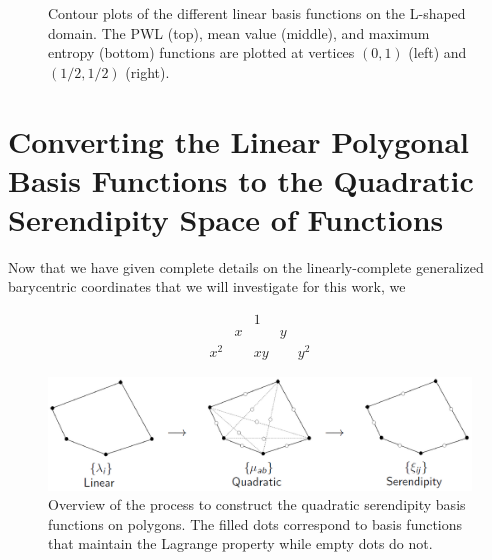 \begin{figure}
{\begin{subfigure}[b]{0.375\textwidth}
	\end{subfigure}
}
\vspace{2mm}
\caption[Contour plots of the linear basis functions on the L-shaped domain.]{Contour plots of the different linear basis functions on the L-shaped domain. The PWL (top), mean value (middle), and maximum entropy (bottom) functions are plotted at vertices $(0,1)$ (left) and $(1/2,1/2)$ (right).}
\label{fig::2DSummary_Ldom_basis_functions}
\end{figure}

\section{Converting the Linear Polygonal Basis Functions to the Quadratic Serendipity Space of Functions}
\label{sec::BF_2DQuadratic}

Now that we have given complete details on the linearly-complete generalized barycentric coordinates that we will investigate for this work, we 

\begin{equation}
\label{eq::BF_quad_pascal}
\begin{array}{ccccc}
 & & 1 & & \\
 & x & & y & \\
 x^2 &  &xy & & y^2
\end{array}
\end{equation}

\begin{figure}[hbt]
\centering
\includegraphics[width=\textwidth]{figures/sec_BF/linear_to_quad_process.png}
\caption{Overview of the process to construct the quadratic serendipity basis functions on polygons. The filled dots correspond to basis functions that maintain the Lagrange property while empty dots do not.}
\label{fig::BF_2D_quad_process}
\end{figure}

